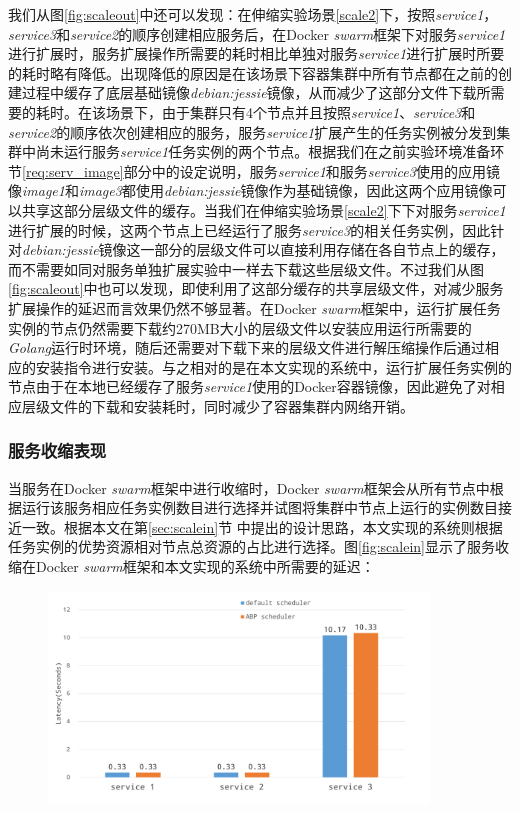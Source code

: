 我们从图\ref{fig:scaleout}中还可以发现：在伸缩实验场景\ref{scale2}下，按照\emph{service1}，\emph{service3}和\emph{service2}的顺序创建相应服务后，在Docker \emph{swarm}框架下对服务\emph{service1}进行扩展时，服务扩展操作所需要的耗时相比单独对服务\emph{service1}进行扩展时所要的耗时略有降低。出现降低的原因是在该场景下容器集群中所有节点都在之前的创建过程中缓存了底层基础镜像\emph{debian:jessie}镜像，从而减少了这部分文件下载所需要的耗时。在该场景下，由于集群只有4个节点并且按照\emph{service1}、\emph{service3}和\emph{service2}的顺序依次创建相应的服务，服务\emph{service1}扩展产生的任务实例被分发到集群中尚未运行服务\emph{service1}任务实例的两个节点。根据我们在之前实验环境准备环节\ref{req:serv_image}部分中的设定说明，服务\emph{service1}和服务\emph{service3}使用的应用镜像\emph{image1}和\emph{image3}都使用\emph{debian:jessie}镜像作为基础镜像，因此这两个应用镜像可以共享这部分层级文件的缓存。当我们在伸缩实验场景\ref{scale2}下下对服务\emph{service1}进行扩展的时候，这两个节点上已经运行了服务\emph{service3}的相关任务实例，因此针对\emph{debian:jessie}镜像这一部分的层级文件可以直接利用存储在各自节点上的缓存，而不需要如同对服务单独扩展实验中一样去下载这些层级文件。不过我们从图\ref{fig:scaleout}中也可以发现，即使利用了这部分缓存的共享层级文件，对减少服务扩展操作的延迟而言效果仍然不够显著。在Docker \emph{swarm}框架中，运行扩展任务实例的节点仍然需要下载约270MB大小的层级文件以安装应用运行所需要的\emph{Golang}运行时环境，随后还需要对下载下来的层级文件进行解压缩操作后通过相应的安装指令进行安装。与之相对的是在本文实现的系统中，运行扩展任务实例的节点由于在本地已经缓存了服务\emph{service1}使用的Docker容器镜像，因此避免了对相应层级文件的下载和安装耗时，同时减少了容器集群内网络开销。

\subsubsection{服务收缩表现}
当服务在Docker \emph{swarm}框架中进行收缩时，Docker \emph{swarm}框架会从所有节点中根据运行该服务相应任务实例数目进行选择并试图将集群中节点上运行的实例数目接近一致。根据本文在第\ref{sec:scalein}节
中提出的设计思路，本文实现的系统则根据任务实例的优势资源相对节点总资源的占比进行选择。图\ref{fig:scalein}显示了服务收缩在Docker \emph{swarm}框架和本文实现的系统中所需要的延迟：
\begin{figure}[H]
\centering
\includegraphics[width=0.9\textwidth]{./figure/scalein}
\end{figure}

